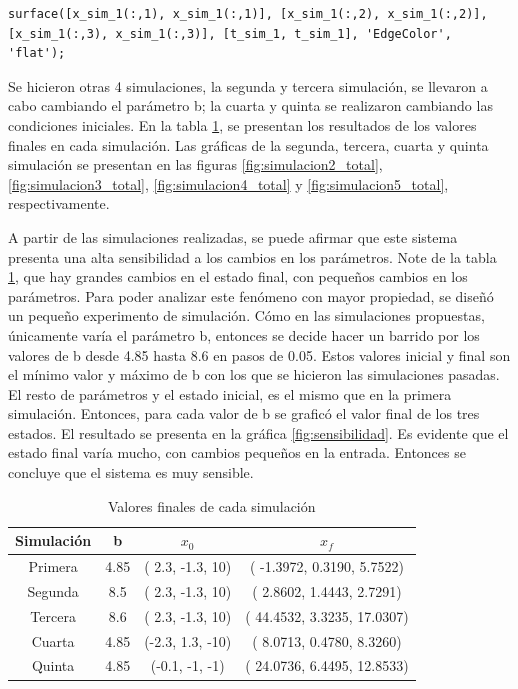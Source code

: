 \documentclass[12pt,letterpaper]{article}
\begin{document}
\begin{lstlisting}[style=Matlab-editor, basicstyle=\mlttfamily]
    surface([x_sim_1(:,1), x_sim_1(:,1)], [x_sim_1(:,2), x_sim_1(:,2)], [x_sim_1(:,3), x_sim_1(:,3)], [t_sim_1, t_sim_1], 'EdgeColor', 'flat');
\end{lstlisting}

Se hicieron otras 4 simulaciones, la segunda y tercera simulación, se llevaron a cabo cambiando el
parámetro b; la cuarta y quinta se realizaron cambiando las condiciones iniciales. En la tabla
\ref{table:finales_ejercicio_1}, se presentan los resultados de los valores finales en cada
simulación. Las gráficas de la segunda, tercera, cuarta y quinta simulación se presentan en las
figuras \ref{fig:simulacion2_total}, \ref{fig:simulacion3_total}, \ref{fig:simulacion4_total} y
\ref{fig:simulacion5_total}, respectivamente.

A partir de las simulaciones realizadas, se puede afirmar que este sistema presenta una alta
sensibilidad a los cambios en los parámetros. Note de la tabla \ref{table:finales_ejercicio_1}, que
hay grandes cambios en el estado final, con pequeños cambios en los parámetros. Para poder analizar
este fenómeno con mayor propiedad, se diseñó un pequeño experimento de simulación. Cómo en las
simulaciones propuestas, únicamente varía el parámetro b, entonces se decide hacer un barrido por
los valores de b desde 4.85 hasta 8.6 en pasos de 0.05. Estos valores inicial y final son el mínimo
valor y máximo de b con los que se hicieron las simulaciones pasadas. El resto de parámetros y el
estado inicial, es el mismo que en la primera simulación. Entonces, para cada valor de b se graficó
el valor final de los tres estados. El resultado se presenta en la gráfica
\ref{fig:sensibilidad}. Es evidente que el estado final varía mucho, con cambios pequeños en la
entrada. Entonces se concluye que el sistema es muy sensible.


\begin{table}
\caption{Valores finales de cada simulación}
\label{table:finales_ejercicio_1}
\centering
\begin{tabular}{| c | c  c  c|}
  \hline
 Simulación & b   & $x_0$   & $x_f$   \\
 \hline
 Primera    & 4.85&( 2.3, -1.3,  10) &( -1.3972, 0.3190, 5.7522) \\
 Segunda    & 8.5& ( 2.3, -1.3,  10) &( 2.8602,  1.4443, 2.7291) \\
 Tercera    & 8.6& ( 2.3, -1.3,  10) &( 44.4532, 3.3235, 17.0307)\\
 Cuarta     & 4.85&(-2.3,  1.3, -10) &( 8.0713,  0.4780, 8.3260)\\
 Quinta     & 4.85&(-0.1, -1,    -1) &( 24.0736, 6.4495, 12.8533)\\
 \hline

\end{tabular}
\end{table}
\end{document}

